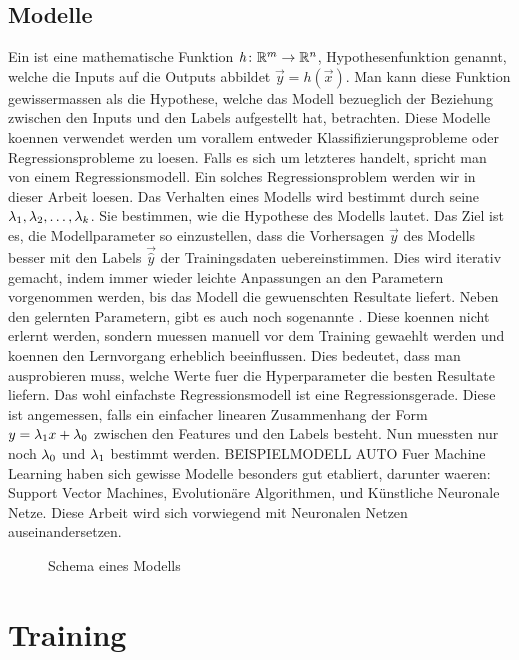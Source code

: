 \subsection{Modelle}
Ein  ist eine mathematische Funktion $\mathit{h}\colon \mathbb{R}^m
\to \mathbb{R}^n$, Hypothesenfunktion genannt, welche die Inputs auf die Outputs abbildet $\vec{y}=\mathit{h}(\vec{x})$.
Man kann diese Funktion gewissermassen als die Hypothese, welche das Modell bezueglich der Beziehung zwischen
den Inputs und den Labels aufgestellt hat, betrachten.
Diese Modelle koennen verwendet werden um vorallem entweder
Klassifizierungsprobleme oder Regressionsprobleme zu loesen. Falls es sich um
letzteres handelt, spricht man von einem Regressionsmodell. Ein solches
Regressionsproblem werden wir in dieser Arbeit loesen.
\para{}
Das Verhalten eines Modells wird bestimmt durch seine 
$\lambda_1, \lambda_2,\ldots,\lambda_k$. Sie bestimmen, wie die Hypothese des Modells lautet.
Das Ziel ist es, die Modellparameter so einzustellen, dass die Vorhersagen
$\vec{y}$ des Modells besser mit den Labels $\vec{\hat{y}}$ der Trainingsdaten uebereinstimmen.
Dies wird iterativ gemacht, indem immer wieder leichte Anpassungen an den
Parametern vorgenommen werden, bis das Modell die gewuenschten Resultate liefert.
\para{}
Neben den gelernten Parametern, gibt es auch noch sogenannte .
Diese koennen nicht erlernt werden, sondern muessen manuell vor dem Training gewaehlt werden und koennen den Lernvorgang erheblich beeinflussen.
Dies bedeutet, dass man ausprobieren muss, welche Werte fuer die Hyperparameter
die besten Resultate liefern.
\para{}
Das wohl einfachste Regressionsmodell ist eine Regressionsgerade. Diese ist
angemessen, falls ein einfacher linearen Zusammenhang der Form $y=\lambda_1x +
\lambda_0$ zwischen den Features und den Labels besteht.
Nun muessten nur noch $\lambda_0$ und $\lambda_1$ bestimmt werden.
BEISPIELMODELL AUTO
\para{}
Fuer Machine Learning haben sich gewisse Modelle besonders gut etabliert,
darunter waeren: Support Vector Machines, Evolutionäre Algorithmen, und Künstliche Neuronale Netze.
Diese Arbeit wird sich vorwiegend mit Neuronalen Netzen auseinandersetzen.
\\
\begin{figure}[h!]
  \centering


  \caption{Schema eines Modells}
\end{figure}

\section{Training}
